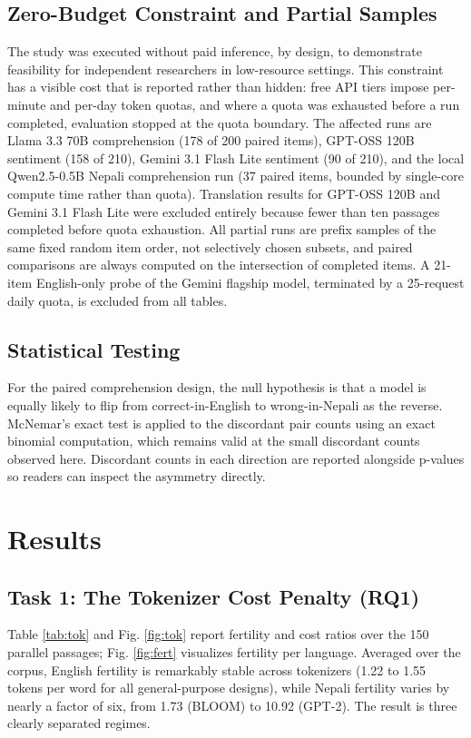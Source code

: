 \documentclass[conference]{IEEEtran}
\begin{document}
\subsection{Zero-Budget Constraint and Partial Samples}
The study was executed without paid inference, by design, to demonstrate feasibility for independent researchers in low-resource settings. This constraint has a visible cost that is reported rather than hidden: free API tiers impose per-minute and per-day token quotas, and where a quota was exhausted before a run completed, evaluation stopped at the quota boundary. The affected runs are Llama 3.3 70B comprehension (178 of 200 paired items), GPT-OSS 120B sentiment (158 of 210), Gemini 3.1 Flash Lite sentiment (90 of 210), and the local Qwen2.5-0.5B Nepali comprehension run (37 paired items, bounded by single-core compute time rather than quota). Translation results for GPT-OSS 120B and Gemini 3.1 Flash Lite were excluded entirely because fewer than ten passages completed before quota exhaustion. All partial runs are prefix samples of the same fixed random item order, not selectively chosen subsets, and paired comparisons are always computed on the intersection of completed items. A 21-item English-only probe of the Gemini flagship model, terminated by a 25-request daily quota, is excluded from all tables.

\subsection{Statistical Testing}
For the paired comprehension design, the null hypothesis is that a model is equally likely to flip from correct-in-English to wrong-in-Nepali as the reverse. McNemar's exact test \cite{mcnemar1947} is applied to the discordant pair counts using an exact binomial computation, which remains valid at the small discordant counts observed here. Discordant counts in each direction are reported alongside p-values so readers can inspect the asymmetry directly.

\section{Results}
\subsection{Task 1: The Tokenizer Cost Penalty (RQ1)}
Table \ref{tab:tok} and Fig. \ref{fig:tok} report fertility and cost ratios over the 150 parallel passages; Fig. \ref{fig:fert} visualizes fertility per language. Averaged over the corpus, English fertility is remarkably stable across tokenizers (1.22 to 1.55 tokens per word for all general-purpose designs), while Nepali fertility varies by nearly a factor of six, from 1.73 (BLOOM) to 10.92 (GPT-2). The result is three clearly separated regimes.
\end{document}
